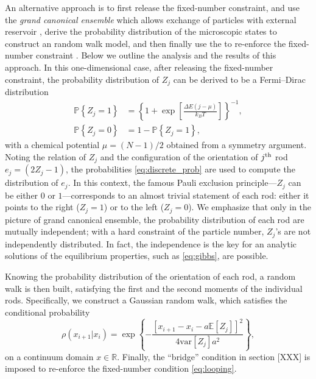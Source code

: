 \documentclass[aps,showpacs,twocolumn,floatfix,prx,superscriptaddress]{revtex4-1}
\begin{document}
An alternative approach is to first release the fixed-number constraint, and use
the \emph{grand canonical ensemble} which allows exchange of particles with
external reservoir \cite{}, derive the probability
distribution of the microscopic states to construct an random walk model, and
then finally use the to re-enforce the fixed-number constraint
\cite{}. Below we outline the analysis and the results of this
approach. In this one-dimensional case, after releasing the fixed-number
constraint, the probability distribution of $Z_j$ can be derived
\cite{} to be a Fermi--Dirac distribution
\begin{subequations}
    \begin{align}
        \label{eq:discrete_prob}
        \mathbb{P} \left\{ Z_j = 1\right\} & =  \left\{1+\exp\left[\frac{ \Delta
                    E \left(j - \mu \right) }{k_B T}\right]\right\}^{-1}, \\
        \mathbb{P} \left\{ Z_j = 0\right\} & = 1 - \mathbb{P} \left\{ Z_j =
            1\right\},
    \end{align}
\end{subequations}
with a chemical potential $\mu = (N-1)/2$ obtained from a symmetry argument.
Noting the relation of $Z_j$ and the configuration of the orientation of $j^{\rm
    th}$ rod $e_j = \left(2Z_j -1\right)$, the probabilities
\eqref{eq:discrete_prob} are used to compute the distribution of $e_j$. In this
context, the famous Pauli exclusion principle---$Z_j$ can be either $0$ or
$1$---corresponds to an almost trivial statement of each rod: either it points to
the right ($Z_j=1$) or to the left ($Z_j=0$).  We emphasize that only in the
picture of grand canonical ensemble, the probability distribution of each rod
are mutually independent; with a hard constraint of the particle number, $Z_j$'s
are not independently distributed. In fact, the independence is the key for an
analytic solutions of the equilibrium properties, such as \eqref{eq:gibbs}, are
possible. 

Knowing the probability distribution of the orientation of each rod, a random
walk is then built, satisfying the first and the second moments of the
individual rods. Specifically, we construct a Gaussian random walk, which
satisfies the conditional probability
\begin{equation}
    \rho\left(x_{i+1} \vert x_i\right) =\exp\left\{ -\frac{\left[x_{i+1}- x_i -
                a\mathbb{E}\left[Z_j\right]\right]^2}{4
            \text{var}\left[Z_j\right]a^2}\right\}, 
\end{equation}
on a continuum domain $x \in \mathbb{R}$. Finally, the ``bridge'' condition in
section [XXX] is imposed to re-enforce the fixed-number condition
\eqref{eq:looping}. 
\end{document}
